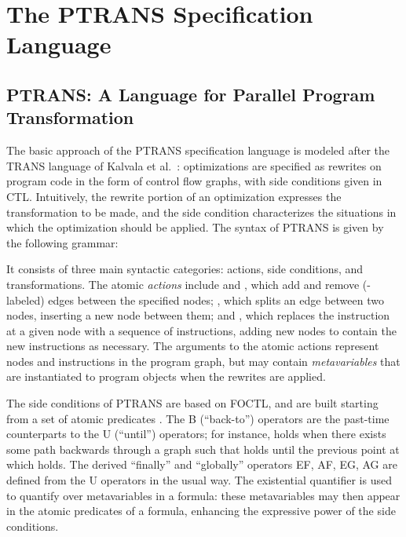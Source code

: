 \documentclass{eptcs}
\newcommand{\ignore}[1]{{}}
\newcommand{\ptrans}[0]{PTRANS}
\begin{document}
\section{The {\ptrans} Specification Language}
\label{framework}
\subsection{{\ptrans}: A Language for Parallel Program Transformation}
The basic approach of the {\ptrans} specification language is modeled after the TRANS language of Kalvala et al.~\cite{kalvala}: optimizations are specified as rewrites on program code in the form of control flow graphs, with side conditions given in \ac{CTL}.  Intuitively, the rewrite portion of an optimization expresses the transformation to be made, and the side condition characterizes the situations in which the optimization should be applied.  \ignore{Our starting point is our previous formalization of the syntax and semantics of TRANS for sequential programs \cite{transssa}.  All formalizations and proofs have been developed in the Isabelle theorem prover \cite{isabelle}, allowing us to provide strong guarantees of correctness for our verified optimizations.}
The syntax of {\ptrans} is given by the following grammar:

It consists of three main syntactic categories: actions, side conditions, and transformations. The atomic \emph{actions}  include  and , which add and remove (-labeled) edges between the specified nodes; , which splits an edge between two nodes, inserting a new node between them; and , which replaces the instruction at a given node with a sequence of instructions, adding new nodes to contain the new instructions as necessary. \ignore{Kalvala et al. have shown that a wide variety of common program transformations can be expressed using these basic rewrites.}  The arguments to the atomic actions represent nodes and instructions in the program graph, but may contain \emph{metavariables} that are instantiated to program objects when the rewrites are applied.

The side conditions  of {\ptrans} are based on \ac{FOCTL}, and are built starting from a set of atomic predicates . The B (``back-to'') operators are the past-time counterparts to the U (``until'') operators; for instance,  holds when there exists some path backwards through a graph such that  holds until the previous point at which  holds. The derived ``finally'' and ``globally'' operators EF, AF, EG, AG are defined from the U operators in the usual way. 
The existential quantifier  is used to quantify over metavariables in a formula: these metavariables may then appear in the atomic predicates of a formula, enhancing the expressive power of the side conditions.
\end{document}

